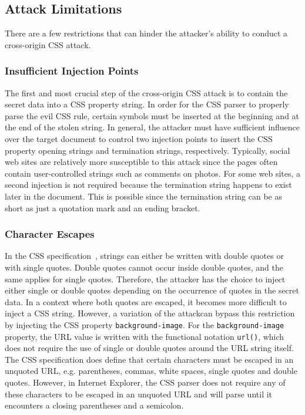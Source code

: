 \documentclass{acm_proc_article-sp}
\begin{document}
\subsection{Attack Limitations}
There are a few restrictions that can hinder the attacker's ability to conduct a cross-origin CSS attack.

\subsubsection{Insufficient Injection Points}
The first and most crucial step of the cross-origin CSS attack is to contain the secret data into a CSS property string. In order for the CSS parser to properly parse the evil CSS rule, certain symbols must be inserted at the beginning and at the end of the stolen string. In general, the attacker must have sufficient influence over the target document to control two injection points to insert the CSS property opening strings and termination strings, respectively. Typically, social web sites are relatively more susceptible to this attack since the pages often contain user-controlled strings such as comments on photos. For some web sites, a second injection is not required because the termination string happens to exist later in the document. This is possible since the termination string can be as short as just a quotation mark and an ending bracket. 

\subsubsection{Character Escapes} \label{sec:escapes}
In the CSS specification~\cite{css}, strings can either be written with double quotes or with single quotes. Double quotes cannot occur inside double quotes, and the same applies for single quotes. Therefore, the attacker has the choice to inject either single or double quotes depending on the occurrence of quotes in the secret data. In a context where both quotes are escaped, it becomes more difficult to inject a CSS string. However, a variation of the attackcan bypass this restriction by injecting the CSS property \texttt{background-image}. For the \texttt{background-image} property, the URL value is written with the functional notation \texttt{url()}, which does not require the use of single or double quotes around the URL string itself. The CSS specification does define that certain characters must be escaped in an unquoted URL, e.g. parentheses, commas, white spaces, single quotes and double quotes. However, in Internet Explorer, the CSS parser does not require any of these characters to be escaped in an unquoted URL and will parse until it encounters a closing parentheses and a semicolon.
\end{document}
